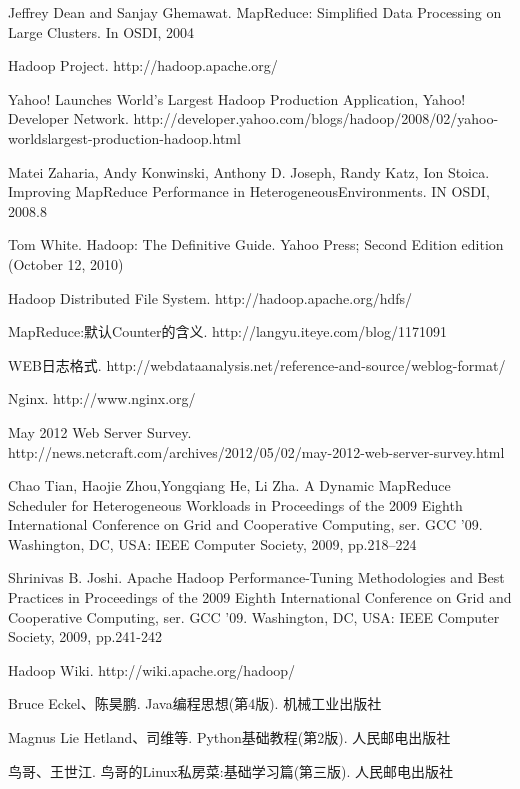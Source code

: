\fontsize{10.5pt}{10.5pt}\selectfont
\begin{thebibliography}{10}

Jeffrey Dean and Sanjay Ghemawat.
\newblock MapReduce: Simplified Data Processing on Large Clusters.
\newblock In OSDI, 2004

Hadoop Project.
\newblock http://hadoop.apache.org/

Yahoo! Launches World’s Largest Hadoop Production Application, Yahoo! Developer Network.
\newblock http://developer.yahoo.com/blogs/hadoop/2008/02/yahoo-worldslargest-production-hadoop.html


Matei Zaharia, Andy Konwinski, Anthony D. Joseph, Randy Katz, Ion Stoica.
\newblock Improving MapReduce Performance in HeterogeneousEnvironments.
\newblock IN OSDI, 2008.8


Tom White.
\newblock Hadoop: The Definitive Guide.
\newblock Yahoo Press; Second Edition edition (October 12, 2010)

Hadoop Distributed File System.
\newblock http://hadoop.apache.org/hdfs/

MapReduce:默认Counter的含义.
\newblock http://langyu.iteye.com/blog/1171091

WEB日志格式.
\newblock http://webdataanalysis.net/reference-and-source/weblog-format/

Nginx.
\newblock http://www.nginx.org/

May 2012 Web Server Survey.
\newblock http://news.netcraft.com/archives/2012/05/02/may-2012-web-server-survey.html


Chao Tian, Haojie Zhou,Yongqiang He, Li Zha.
\newblock A Dynamic MapReduce Scheduler for Heterogeneous Workloads
\newblock in Proceedings of the 2009 Eighth International Conference on Grid and Cooperative Computing, ser. GCC ’09. Washington, DC, USA: IEEE Computer Society, 2009, pp.218–224


Shrinivas B. Joshi.
\newblock Apache Hadoop Performance-Tuning Methodologies and Best Practices
\newblock in Proceedings of the 2009 Eighth International Conference on Grid and Cooperative Computing, ser. GCC ’09. Washington, DC, USA: IEEE Computer Society, 2009, pp.241-242 

Hadoop Wiki.
\newblock http://wiki.apache.org/hadoop/

Bruce Eckel、陈昊鹏.
\newblock Java编程思想(第4版).
\newblock 机械工业出版社

Magnus Lie Hetland、司维等.
\newblock Python基础教程(第2版).
\newblock 人民邮电出版社

鸟哥、王世江.
\newblock 鸟哥的Linux私房菜:基础学习篇(第三版).
\newblock 人民邮电出版社

\end{thebibliography}
